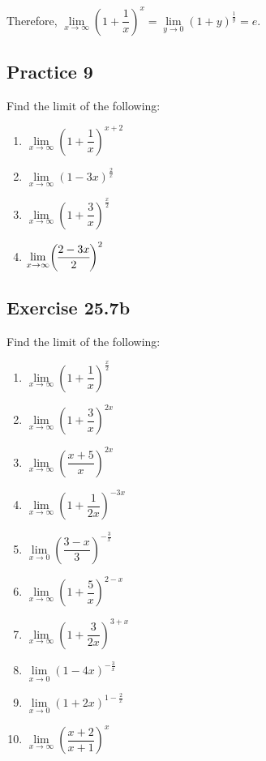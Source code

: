 \documentclass[12pt]{report}
\begin{document}
Therefore, $\lim\limits_{x\to\infty}{{\left(1 + \dfrac{1}{x}\right)}^{x}} =
    \lim\limits_{y\to0}{{\left(1 + y\right)}^{\frac{1}{y}}} = e$.

\subsection{Practice 9}

Find the limit of the following: \setlength{\columnseprule}{1pt}
\setlength{\columnsep}{24pt}
\begin{multicols}{2}
    \begin{enumerate}
        \item $\lim\limits_{x\to\infty}{\left(1+{\dfrac{1}{x}}\right)}^{x+2}$
        \item $\lim\limits_{x\to\infty}{\left(1-3x\right)}^{\frac{2}{x}}$
        \item $\lim\limits_{x\to\infty}{\left(1+\dfrac{3}{x}\right)}^{\frac{x}{2}}$
        \item $\lim\limits_{x\to\infty}\biggl{(\dfrac{2-3x}{2}\biggr)}^{2}$
    \end{enumerate}
\end{multicols}

\subsection{Exercise 25.7b}

Find the limit of the following: \setlength{\columnseprule}{1pt}
\setlength{\columnsep}{24pt}
\begin{multicols}{2}
    \begin{enumerate}
        \item $\lim\limits_{x\to\infty}{\left(1+\dfrac{1}{x}\right)}^{\frac{x}{2}}$
        \item $\lim\limits_{x\to\infty}{\left(1+\dfrac{3}{x}\right)}^{2x}$
        \item $\lim\limits_{x\to\infty}{\left({\dfrac{x+5}{x}}\right)}^{2x}$
        \item $\lim\limits_{x\to\infty}{\left(1+{\dfrac{1}{2x}}\right)}^{-3x}$
        \item $\lim\limits_{x\to0}{\left({\dfrac{3-x}{3}}\right)}^{-{\frac{3}{x}}}$
        \item $\lim\limits_{x\to\infty}{\left(1+{\dfrac{5}{x}}\right)}^{2-x}$
        \item $\lim\limits_{x\to\infty}{\left(1+\dfrac{3}{2x}\right)}^{3+x}$
        \item $\lim\limits_{x\to0}{\left(1-4x\right)}^{-\frac{3}{x}}$
        \item $\lim\limits_{x\to0}{\left(1+2x\right)}^{1-\frac{2}{x}}$
        \item $\lim\limits_{x\to\infty}{\left({\dfrac{x+2}{x+1}}\right)}^{x}$
    \end{enumerate}
\end{multicols}
\end{document}
